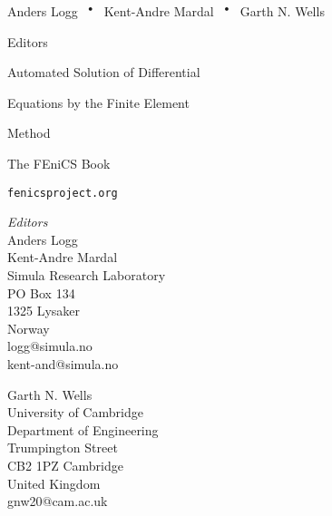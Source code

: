 \thispagestyle{empty}

\noindent
{\Large Anders Logg}
{$\,\,\,^\bullet\,\,\,$}
{\Large Kent-Andre Mardal}
{$\,\,\,^\bullet\,\,\,$}
{\Large Garth N. Wells}

\vspace{1ex}

\noindent
{\large Editors}

\vspace{11ex}

\noindent
{\Huge Automated Solution of Differential}

\vspace{2.5ex}

\noindent
{\Huge Equations by the Finite Element}

\vspace{2ex}

\noindent
{\Huge Method}

\vspace{6ex}

\noindent
{\Large
The FEniCS Book}

\vfill

\noindent
{\large \tt fenicsproject.org}

\newpage
\thispagestyle{empty}

\noindent
\begin{minipage}{0.5\textwidth}
  \emph{Editors} \\
  Anders Logg \\
  Kent-Andre Mardal \\
  Simula Research Laboratory \\
  PO Box 134 \\
  1325 Lysaker \\
  Norway \\
  logg@simula.no \\
  kent-and@simula.no
\end{minipage}
\begin{minipage}{0.5\textwidth}
  \noindent
  Garth N. Wells \\
  University of Cambridge \\
  Department of Engineering \\
  Trumpington Street \\
  CB2 1PZ Cambridge \\
  United Kingdom \\
  gnw20@cam.ac.uk \\
\end{minipage}

